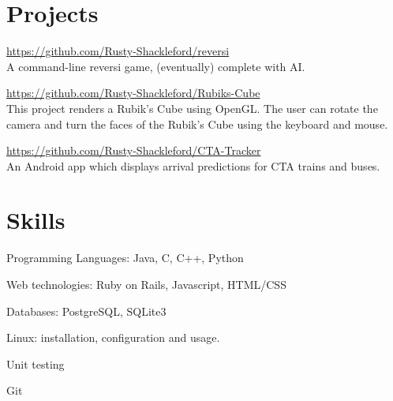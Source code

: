\documentclass[letterpaper, 11pt, oneside]{memoir}
\begin{document}
\section*{Projects}
\begin{compactitem}
    \item \url{https://github.com/Rusty-Shackleford/reversi} \\
    A command-line reversi game, (eventually) complete with AI.
    
    \item \url{https://github.com/Rusty-Shackleford/Rubiks-Cube} \\
    This project renders a Rubik's Cube using OpenGL. The user can rotate the 
    camera and turn the faces of the Rubik's Cube using the keyboard and mouse.

    \item \url{https://github.com/Rusty-Shackleford/CTA-Tracker} \\
    An Android app which displays arrival predictions for CTA trains and buses.
\end{compactitem}


\section*{Skills}
\begin{compactitem}
    \item Programming Languages: Java, C, C++, Python
    \item Web technologies: Ruby on Rails, Javascript, HTML/CSS
    \item Databases: PostgreSQL, SQLite3
    \item Linux: installation, configuration and usage.
    \item Unit testing
    \item Git
\end{compactitem}
\end{document}
